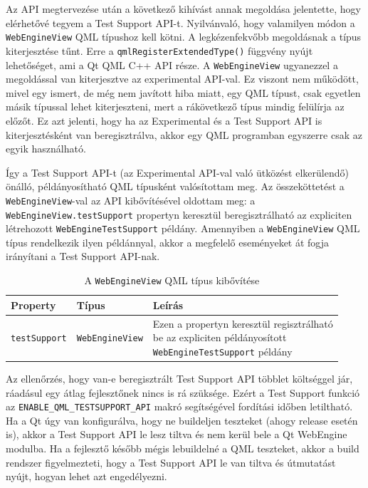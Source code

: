 \documentclass[12pt]{report}
\begin{document}
Az API megtervezése után a következő kihívást annak megoldása jelentette, hogy elérhetővé
tegyem a Test Support API-t. Nyilvánvaló, hogy valamilyen módon a \texttt{WebEngineView} QML
típushoz kell kötni. A legkézenfekvőbb megoldásnak a típus kiterjesztése tűnt. Erre a
\texttt{qmlRegisterExtendedType()} függvény nyújt lehetőséget, ami a Qt QML C++ API része.
A \texttt{WebEngineView} ugyanezzel a megoldással van kiterjesztve az experimental
API-val. Ez viszont nem működött, mivel egy ismert, de még nem javított hiba miatt,
egy QML típust, csak egyetlen másik típussal lehet kiterjeszteni, mert a rákövetkező típus
mindig felülírja az előzőt. Ez azt jelenti, hogy ha az Experimental és a Test Support API is
kiterjesztésként van beregisztrálva, akkor egy QML programban egyszerre csak az egyik
használható.

Így a Test Support API-t (az Experimental API-val való ütközést elkerülendő) önálló,
példányosítható QML típusként valósítottam meg. Az összeköttetést a
\texttt{WebEngineView}-val az API kibővítésével oldottam meg:
a \texttt{WebEngineView.testSupport} propertyn keresztül beregisztrálható az expliciten
létrehozott \texttt{WebEngineTestSupport} példány. Amennyiben a \texttt{WebEngineView}
QML típus rendelkezik ilyen példánnyal, akkor a megfelelő eseményeket át fogja irányítani
a Test Support API-nak.
\begin{table}[h]
    \centering
    \begin{tabular}{ | l | l | p{216pt} | }
        \hline
        \textbf{Property} & \textbf{Típus} & \textbf{Leírás} \\ \hline

        \texttt{testSupport} & \texttt{WebEngineView} &
        \makecell[l]{
            Ezen a propertyn keresztül regisztrálható \\
            be az expliciten példányosított \\
            \texttt{WebEngineTestSupport} példány}
        \\ \hline
    \end{tabular}
    \caption{
        \label{tab:test-support-webengine-view}
        A \texttt{WebEngineView} QML típus kibővítése
    }
\end{table}

Az ellenőrzés, hogy van-e beregisztrált Test Support API többlet költséggel jár, ráadásul
egy átlag fejlesztőnek nincs is rá szüksége. Ezért a Test Support funkció az
\texttt{ENABLE\_QML\_TESTSUPPORT\_API} makró segítségével fordítási időben letiltható.
Ha a Qt úgy van konfigurálva, hogy ne buildeljen teszteket (ahogy release esetén is), akkor a
Test Support API le lesz tiltva és nem kerül bele a Qt WebEngine modulba. Ha a fejlesztő
később mégis lebuildelné a QML teszteket, akkor a build rendszer figyelmezteti, hogy a
Test Support API le van tiltva és útmutatást nyújt, hogyan lehet azt engedélyezni.
\end{document}
